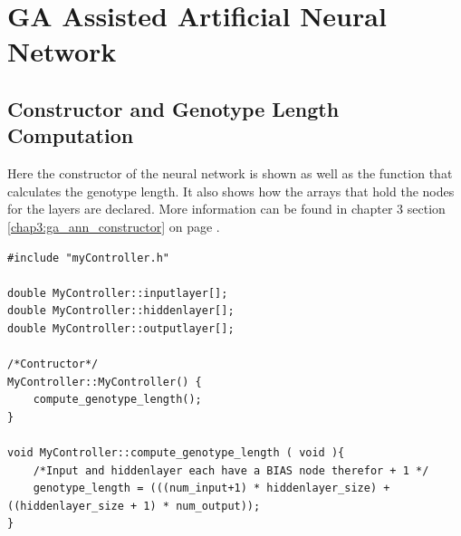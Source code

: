 \section{GA Assisted Artificial Neural Network}
\subsection{Constructor and Genotype Length Computation}
\label{code:ga_ann_constructor}
Here the constructor of the neural network is shown as well as the function that calculates the genotype length. 
It also shows how the arrays that hold the nodes for the layers are declared. More information can be found in chapter 3 section \ref{chap3:ga_ann_constructor} on page \pageref{chap3:ga_ann_constructor}.


\begin{lstlisting}[caption = {GA Assisted Artificial Neural Network Constructor and Genotype Length Computation}]
#include "myController.h"

double MyController::inputlayer[];
double MyController::hiddenlayer[];
double MyController::outputlayer[];

/*Contructor*/
MyController::MyController() {
    compute_genotype_length();
}

void MyController::compute_genotype_length ( void ){
    /*Input and hiddenlayer each have a BIAS node therefor + 1 */
    genotype_length = (((num_input+1) * hiddenlayer_size) + ((hiddenlayer_size + 1) * num_output));
}
\end{lstlisting}

